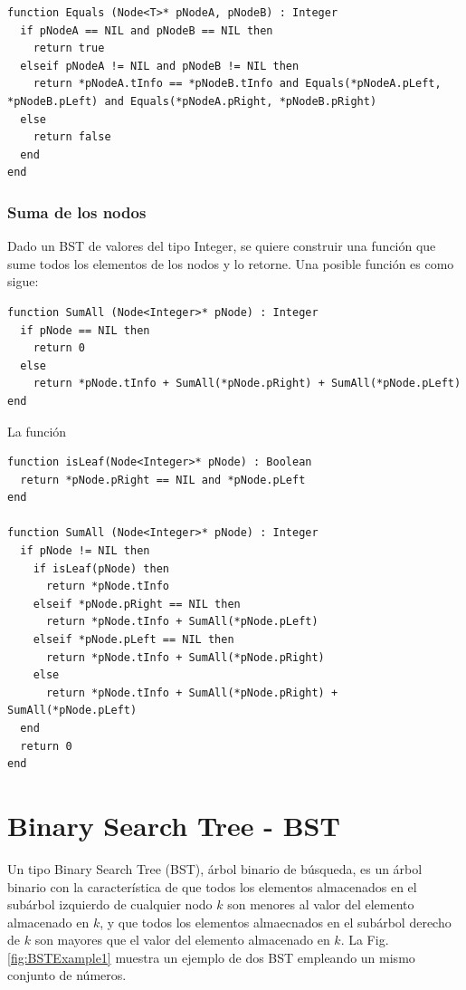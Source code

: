 \begin{lstlisting}[upquote=true, language=pseudo]
function Equals (Node<T>* pNodeA, pNodeB) : Integer
  if pNodeA == NIL and pNodeB == NIL then
    return true
  elseif pNodeA != NIL and pNodeB != NIL then
    return *pNodeA.tInfo == *pNodeB.tInfo and Equals(*pNodeA.pLeft, *pNodeB.pLeft) and Equals(*pNodeA.pRight, *pNodeB.pRight)
  else
    return false
  end
end
\end{lstlisting}


\subsubsection{Suma de los nodos}

Dado un BST de valores del tipo Integer, se quiere construir una función que sume todos los elementos de los nodos y lo retorne. Una posible función es como sigue:

\begin{lstlisting}[upquote=true, language=pseudo]
function SumAll (Node<Integer>* pNode) : Integer
  if pNode == NIL then
    return 0
  else
    return *pNode.tInfo + SumAll(*pNode.pRight) + SumAll(*pNode.pLeft)
end
\end{lstlisting}

La función

\begin{lstlisting}[upquote=true, language=pseudo]
function isLeaf(Node<Integer>* pNode) : Boolean
  return *pNode.pRight == NIL and *pNode.pLeft
end

function SumAll (Node<Integer>* pNode) : Integer
  if pNode != NIL then
    if isLeaf(pNode) then
      return *pNode.tInfo
    elseif *pNode.pRight == NIL then
      return *pNode.tInfo + SumAll(*pNode.pLeft)
    elseif *pNode.pLeft == NIL then
      return *pNode.tInfo + SumAll(*pNode.pRight)
    else
      return *pNode.tInfo + SumAll(*pNode.pRight) + SumAll(*pNode.pLeft)
  end
  return 0
end
\end{lstlisting}


\section{Binary Search Tree - BST}

Un tipo Binary Search Tree (BST), árbol binario de búsqueda, es un árbol binario con la característica de que todos los elementos almacenados en el subárbol izquierdo de cualquier nodo $k$ son menores al valor del elemento almacenado en $k$, y que todos los elementos almaecnados en el subárbol derecho de $k$ son mayores que el valor del elemento almacenado en $k$. La Fig. \ref{fig:BSTExample1} muestra un ejemplo de dos BST empleando un mismo conjunto de números.

